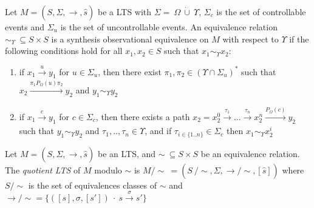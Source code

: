 \begin{definition}
    \label{def:synth-equiv}
    Let $M = (S, \Sigma, \xrightarrow[]{}, \hat{s})$ be a LTS with  $\Sigma = \ \Omega \ \dot{\cup} \ \Upsilon$, $\Sigma_c$ is the set of controllable events and $\Sigma_u$ is the set of uncontrollable events. An equivalence relation $\sim_{\Upsilon} \ \subseteq S \times S$ is a synthesis observational equivalence on $M$ with respect to $\Upsilon$ if the following conditions hold for all $x_1, x_2 \in S$ such that $x_1 \sim_{\Upsilon} x_2$:
\vspace{-0.2pt}
    \begin{enumerate}
        \item if $x_1 \xrightarrow[]{u} y_1$ for $u \in \Sigma_u$, then there exist $\pi_1, \pi_2 \in (\Upsilon \cap \Sigma_u)^{*}$ such that $x_2 \xrightarrow[]{\pi_1 P_{\Omega}(u) \pi_2} y_2$ and $y_1 \sim_{\Upsilon} y_2$
        \item if $x_1 \xrightarrow[]{c} y_1$ for $c \in \Sigma_c$, then there exists a path $x_2 = x_2^{0} \xrightarrow[]{\tau_1} ... \xrightarrow[]{\tau_n} x_2^{n} \xrightarrow[]{P_{\Omega}(c)} y_2$ such that $y_1 \sim_{\Upsilon} y_2$ and $\tau_1, .., \tau_n \in \Upsilon$, and if $\tau_{i\in\{1 .. n\}} \in \Sigma_c$ then $x_1 \sim_{\Upsilon} x_2^i$
    \end{enumerate}
\end{definition}

\begin{definition}
Let $M = (S, \Sigma, \xrightarrow[]{}, \hat{s})$ be an LTS, %
and $\sim
\ \subseteq S \times  S$ be an equivalence relation. The \textit{quotient LTS} of $M$
modulo $\sim$
is $M \! \slash \! \!\sim\ =  (S \! \!\ \slash \! \! \sim, \Sigma, \xrightarrow[]{} \! \! \slash \! \! \sim,  [\hat{s}])$ where $S \! \slash \! \! \sim$ is the set of equivalences classes of $\sim$ and $\xrightarrow[]{} \! \! \slash \!  \! \sim =  \{ ([s], \sigma, [s']) \ \cdot \ s \xrightarrow[]{\sigma} s' \}$
\end{definition}

